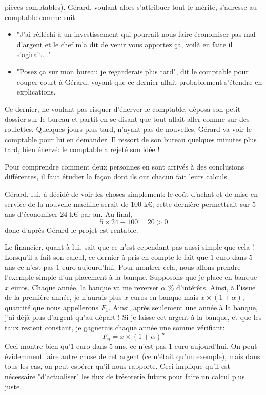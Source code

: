 pièces comptables).
Gérard, voulant alors s'attribuer tout le mérite, s'adresse 
au comptable comme suit \\
\begin{itemize}
  \item "J'ai réfléchi à un investissement qui pourrait nous faire 
    économiser pas mal d'argent et le chef m'a dit de venir vous apportez ça,
	voilà en faite il s'agirait..."
  \item "Posez ça sur mon bureau je regarderais plus tard", 
    dit le comptable pour couper court à Gérard, voyant que 
    ce dernier allait probablement s'étendre en explications.
\end{itemize}
\hspace*{\parindent}Ce dernier, ne voulant pas risquer d'énerver le comptable, 
déposa son petit dossier sur le bureau et partit en se disant 
que tout allait aller comme sur des roulettes.
\hspace*{\parindent}Quelques jours plus tard, n'ayant pas de nouvelles,
Gérard va voir le comptable pour lui en demander. 
Il ressort de son bureau quelques minutes plus tard, bien 
énervé: le comptable a rejeté son idée ! 


Pour comprendre comment deux personnes en sont arrivés 
à des conclusions différentes, il faut étudier la façon 
dont ils ont chacun fait leurs calculs.

Gérard, lui, à décidé de voir les choses simplement: le 
coût d'achat et de mise en service de la nouvelle machine 
serait de 100 k\euro\/; cette dernière permettrait sur 5 ans 
d'économiser 24 k\euro\/ par an. Au final, 
\[ 5 \times 24 - 100 = 20 > 0 \]
donc d'après Gérard le projet est rentable.

Le financier, quant à lui, sait que ce n'est 
cependant pas aussi simple que cela ! 
Lorsqu'il a fait son calcul, ce dernier à pris en compte 
le fait que $1$ euro dans 5 ans ce n'est pas $1$ euro aujourd'hui. 
Pour montrer cela, nous allons prendre l'exemple simple d'un placement à 
la banque. Supposons que je place en banque $x$ euros. 
Chaque année, la banque va me reverser $\alpha$ \% d'intérêts.
Ainsi, à l'issue de la première année, je n'aurais plus $x$ 
euros en banque mais $x \times (1+\alpha)$, quantité 
que nous appellerons $F_1$. 
\hspace*{\parindent}Ainsi, après seulement une année à la banque, 
j'ai déjà plus d'argent qu'au départ !
Si je laisse cet argent à la banque, et que les taux restent 
constant, je gagnerais chaque année une somme vérifiant:
\[ F_n = x \times (1+\alpha)^n \]
Ceci montre bien qu'$1$ euro dans 5 ans, ce n'est pas $1$ euro 
aujourd'hui.
On peut évidemment faire autre chose de cet argent 
(ce n'était qu'un exemple), mais dans 
tous les cas, on peut espérer qu'il nous rapporte. 
Ceci implique qu'il est nécessaire "d'actualiser" les 
flux de trésorerie futurs pour faire un calcul plus juste.

